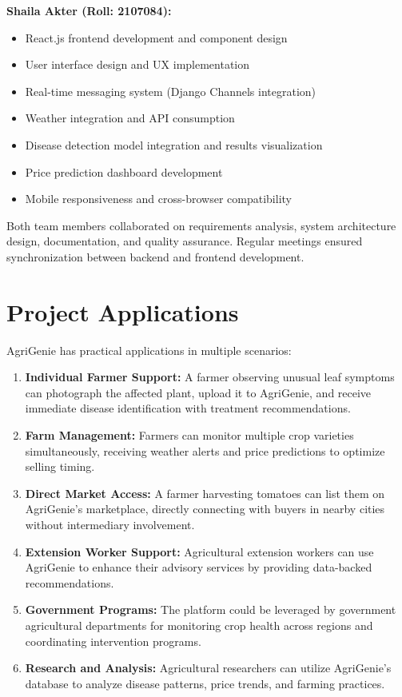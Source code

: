 \documentclass[12pt,a4paper]{report}
\begin{document}
\textbf{Shaila Akter (Roll: 2107084):}
\begin{itemize}
    \item React.js frontend development and component design
    \item User interface design and UX implementation
    \item Real-time messaging system (Django Channels integration)
    \item Weather integration and API consumption
    \item Disease detection model integration and results visualization
    \item Price prediction dashboard development
    \item Mobile responsiveness and cross-browser compatibility
\end{itemize}

Both team members collaborated on requirements analysis, system architecture design, documentation, and quality assurance. Regular meetings ensured synchronization between backend and frontend development.

\section{Project Applications}

AgriGenie has practical applications in multiple scenarios:

\begin{enumerate}
    \item \textbf{Individual Farmer Support:} A farmer observing unusual leaf symptoms can photograph the affected plant, upload it to AgriGenie, and receive immediate disease identification with treatment recommendations.
    
    \item \textbf{Farm Management:} Farmers can monitor multiple crop varieties simultaneously, receiving weather alerts and price predictions to optimize selling timing.
    
    \item \textbf{Direct Market Access:} A farmer harvesting tomatoes can list them on AgriGenie's marketplace, directly connecting with buyers in nearby cities without intermediary involvement.
    
    \item \textbf{Extension Worker Support:} Agricultural extension workers can use AgriGenie to enhance their advisory services by providing data-backed recommendations.
    
    \item \textbf{Government Programs:} The platform could be leveraged by government agricultural departments for monitoring crop health across regions and coordinating intervention programs.
    
    \item \textbf{Research and Analysis:} Agricultural researchers can utilize AgriGenie's database to analyze disease patterns, price trends, and farming practices.
\end{enumerate}
\end{document}
